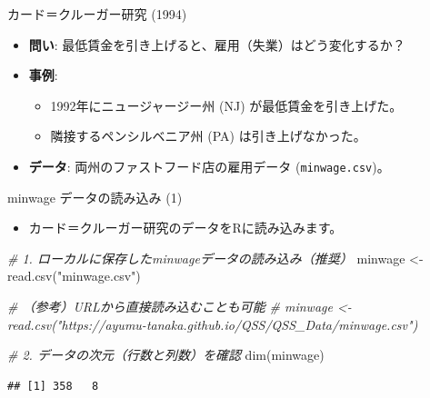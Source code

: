 \documentclass[
  ignorenonframetext,
]{beamer}
\newenvironment{Shaded}{\begin{snugshade}}{\end{snugshade}}
\newcommand{\CommentTok}[1]{\textcolor[rgb]{0.56,0.35,0.01}{\textit{#1}}}
\newcommand{\FunctionTok}[1]{\textcolor[rgb]{0.00,0.00,0.00}{#1}}
\newcommand{\NormalTok}[1]{#1}
\newcommand{\OtherTok}[1]{\textcolor[rgb]{0.56,0.35,0.01}{#1}}
\newcommand{\StringTok}[1]{\textcolor[rgb]{0.31,0.60,0.02}{#1}}
\providecommand{\tightlist}{%
  \setlength{\itemsep}{0pt}\setlength{\parskip}{0pt}}
\begin{document}
\begin{frame}[fragile]{カード＝クルーガー研究 (1994)}
\protect\hypertarget{ux30abux30fcux30c9ux30afux30ebux30fcux30acux30fcux7814ux7a76-1994}{}
\begin{itemize}
\tightlist
\item
  \textbf{問い}: 最低賃金を引き上げると、雇用（失業）はどう変化するか？
\item
  \textbf{事例}:

  \begin{itemize}
  \tightlist
  \item
    1992年にニュージャージー州 (NJ) が最低賃金を引き上げた。
  \item
    隣接するペンシルベニア州 (PA) は引き上げなかった。
  \end{itemize}
\item
  \textbf{データ}: 両州のファストフード店の雇用データ
  (\texttt{minwage.csv})。
\end{itemize}
\end{frame}

\begin{frame}[fragile]{minwage データの読み込み (1)}
\protect\hypertarget{minwage-ux30c7ux30fcux30bfux306eux8aadux307fux8fbcux307f-1}{}
\begin{itemize}
\tightlist
\item
  カード＝クルーガー研究のデータをRに読み込みます。
\end{itemize}

\scriptsize

\begin{Shaded}
\begin{Highlighting}[]
\CommentTok{\# 1. ローカルに保存したminwageデータの読み込み（推奨）}
\NormalTok{minwage }\OtherTok{\textless{}{-}} \FunctionTok{read.csv}\NormalTok{(}\StringTok{"minwage.csv"}\NormalTok{)}

\CommentTok{\# （参考）URLから直接読み込むことも可能}
\CommentTok{\# minwage \textless{}{-} read.csv("https://ayumu{-}tanaka.github.io/QSS/QSS\_Data/minwage.csv")}

\CommentTok{\# 2. データの次元（行数と列数）を確認}
\FunctionTok{dim}\NormalTok{(minwage)}
\end{Highlighting}
\end{Shaded}

\begin{verbatim}
## [1] 358   8
\end{verbatim}

\normalsize
\end{frame}
\end{document}
